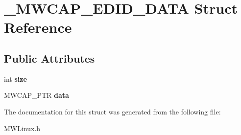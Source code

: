 \hypertarget{struct__MWCAP__EDID__DATA}{\section{\-\_\-\-M\-W\-C\-A\-P\-\_\-\-E\-D\-I\-D\-\_\-\-D\-A\-T\-A Struct Reference}
\label{struct__MWCAP__EDID__DATA}
}
\subsection*{Public Attributes}
\begin{DoxyCompactItemize}
\item 
\hypertarget{struct__MWCAP__EDID__DATA_a084b9fd22664dcca2bd3c5601c41f727}{int {\bfseries size}}\label{struct__MWCAP__EDID__DATA_a084b9fd22664dcca2bd3c5601c41f727}

\item 
\hypertarget{struct__MWCAP__EDID__DATA_a3023a2d032339a3529cfac7684b94d9e}{M\-W\-C\-A\-P\-\_\-\-P\-T\-R {\bfseries data}}\label{struct__MWCAP__EDID__DATA_a3023a2d032339a3529cfac7684b94d9e}

\end{DoxyCompactItemize}


The documentation for this struct was generated from the following file\-:\begin{DoxyCompactItemize}
\item 
M\-W\-Linux.\-h\end{DoxyCompactItemize}
